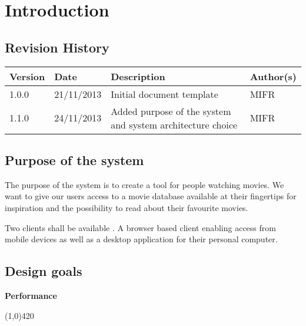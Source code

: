 \chapter{Introduction}
\label{sec:introduction}

\section{Revision History}
\begin{center}
    \begin{tabular}{ | l | l | p{6cm} | p{4cm} |}
    \hline
    Version & Date & Description & Author(s) 
    \\ \hline
    1.0.0 & 21/11/2013 & Initial document template & MIFR
    \\ \hline
    1.1.0 & 24/11/2013 & Added purpose of the system and system architecture choice & MIFR
    \\ \hline
    
    \end{tabular}
\end{center}

\section{Purpose of the system}
The purpose of the system is to create a tool for people watching movies. We want to give our users access to a movie database available at their fingertips for inspiration and the possibility to read about their favourite movies.

Two clients shall be available . A browser based client enabling access from mobile devices as well as a desktop application for their personal computer.  




\section{Design goals}

\textbf{Performance}
\vspace{-1.1cm}
\begin{center}
\line(1,0){420}
\end{center}


